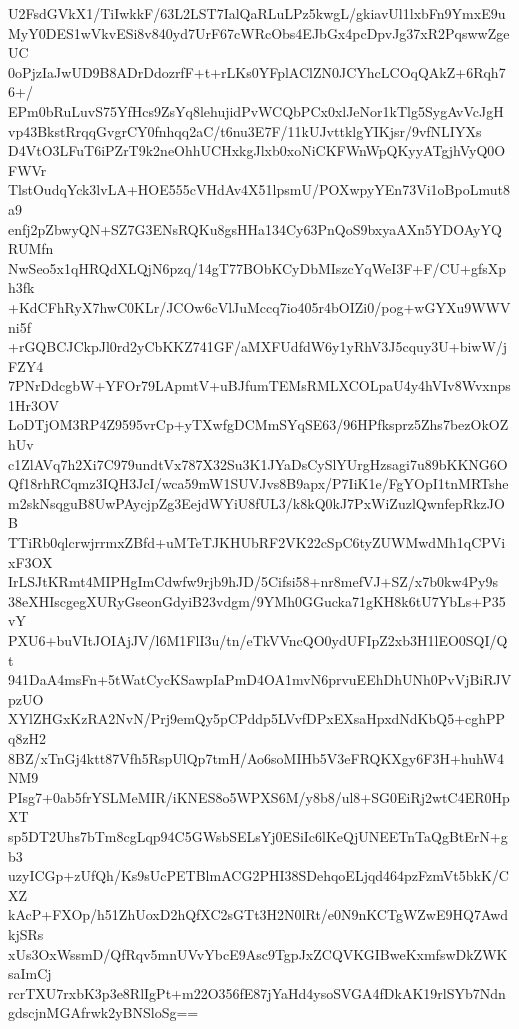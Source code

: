 U2FsdGVkX1/TiIwkkF/63L2LST7IalQaRLuLPz5kwgL/gkiavUl1lxbFn9YmxE9u
MyY0DES1wVkvESi8v840yd7UrF67cWRcObs4EJbGx4pcDpvJg37xR2PqswwZgeUC
0oPjzIaJwUD9B8ADrDdozrfF+t+rLKs0YFplAClZN0JCYhcLCOqQAkZ+6Rqh76+/
EPm0bRuLuvS75YfHcs9ZsYq8lehujidPvWCQbPCx0xlJeNor1kTlg5SygAvVcJgH
vp43BkstRrqqGvgrCY0fnhqq2aC/t6nu3E7F/11kUJvttklgYIKjsr/9vfNLIYXs
D4VtO3LFuT6iPZrT9k2neOhhUCHxkgJlxb0xoNiCKFWnWpQKyyATgjhVyQ0OFWVr
TlstOudqYck3lvLA+HOE555cVHdAv4X51lpsmU/POXwpyYEn73Vi1oBpoLmut8a9
enfj2pZbwyQN+SZ7G3ENsRQKu8gsHHa134Cy63PnQoS9bxyaAXn5YDOAyYQRUMfn
NwSeo5x1qHRQdXLQjN6pzq/14gT77BObKCyDbMIszcYqWeI3F+F/CU+gfsXph3fk
+KdCFhRyX7hwC0KLr/JCOw6cVlJuMccq7io405r4bOIZi0/pog+wGYXu9WWVni5f
+rGQBCJCkpJl0rd2yCbKKZ741GF/aMXFUdfdW6y1yRhV3J5cquy3U+biwW/jFZY4
7PNrDdcgbW+YFOr79LApmtV+uBJfumTEMsRMLXCOLpaU4y4hVIv8Wvxnps1Hr3OV
LoDTjOM3RP4Z9595vrCp+yTXwfgDCMmSYqSE63/96HPfksprz5Zhs7bezOkOZhUv
c1ZlAVq7h2Xi7C979undtVx787X32Su3K1JYaDsCySlYUrgHzsagi7u89bKKNG6O
Qf18rhRCqmz3IQH3JcI/wca59mW1SUVJvs8B9apx/P7IiK1e/FgYOpI1tnMRTshe
m2skNsqguB8UwPAycjpZg3EejdWYiU8fUL3/k8kQ0kJ7PxWiZuzlQwnfepRkzJOB
TTiRb0qlcrwjrrmxZBfd+uMTeTJKHUbRF2VK22cSpC6tyZUWMwdMh1qCPVixF3OX
IrLSJtKRmt4MIPHgImCdwfw9rjb9hJD/5Cifsi58+nr8mefVJ+SZ/x7b0kw4Py9s
38eXHIscgegXURyGseonGdyiB23vdgm/9YMh0GGucka71gKH8k6tU7YbLs+P35vY
PXU6+buVItJOIAjJV/l6M1FlI3u/tn/eTkVVncQO0ydUFIpZ2xb3H1lEO0SQI/Qt
941DaA4msFn+5tWatCycKSawpIaPmD4OA1mvN6prvuEEhDhUNh0PvVjBiRJVpzUO
XYlZHGxKzRA2NvN/Prj9emQy5pCPddp5LVvfDPxEXsaHpxdNdKbQ5+cghPPq8zH2
8BZ/xTnGj4ktt87Vfh5RspUlQp7tmH/Ao6soMIHb5V3eFRQKXgy6F3H+huhW4NM9
PIsg7+0ab5frYSLMeMIR/iKNES8o5WPXS6M/y8b8/ul8+SG0EiRj2wtC4ER0HpXT
sp5DT2Uhs7bTm8cgLqp94C5GWsbSELsYj0ESiIc6lKeQjUNEETnTaQgBtErN+gb3
uzyICGp+zUfQh/Ks9sUcPETBlmACG2PHI38SDehqoELjqd464pzFzmVt5bkK/CXZ
kAcP+FXOp/h51ZhUoxD2hQfXC2sGTt3H2N0lRt/e0N9nKCTgWZwE9HQ7AwdkjSRs
xUs3OxWssmD/QfRqv5mnUVvYbcE9Asc9TgpJxZCQVKGIBweKxmfswDkZWKsaImCj
rcrTXU7rxbK3p3e8RlIgPt+m22O356fE87jYaHd4ysoSVGA4fDkAK19rlSYb7Ndn
gdscjnMGAfrwk2yBNSloSg==
